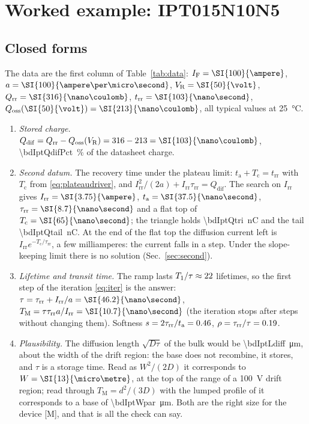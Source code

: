 \documentclass[10pt,a4paper]{scrartcl}
\newcommand{\IF}{I_\mathrm{F}}
\newcommand{\VR}{V_\mathrm{R}}
\newcommand{\Irr}{I_\mathrm{rr}}
\newcommand{\Qrr}{Q_\mathrm{rr}}
\newcommand{\Qdif}{Q_\mathrm{dif}}
\newcommand{\Qoss}{Q_\mathrm{oss}}
\newcommand{\trr}{t_\mathrm{rr}}
\newcommand{\ta}{t_\mathrm{a}}
\newcommand{\Tc}{T_\mathrm{c}}
\newcommand{\taurr}{\tau_\mathrm{rr}}
\newcommand{\TM}{T_\mathrm{M}}
\newcommand{\Tone}{T_1}
\newcommand{\IPT}{IPT015N10N5}
\begin{document}
\section{Worked example: \IPT{}}
\label{sec:example}
\subsection{Closed forms}
\label{sec:closed}
The data are the first column of Table~\ref{tab:data}: $\IF = \SI{\bdIptIf}{\ampere}$, $a = \SI{\bdIptSlope}{\ampere\per\micro\second}$, $\VR = \SI{\bdIptVr}{\volt}$, $\Qrr = \SI{\bdIptQrr}{\nano\coulomb}$, $\trr = \SI{\bdIptTrr}{\nano\second}$, $\Qoss(\SI{50}{\volt}) = \SI{\bdIptQoss}{\nano\coulomb}$, all typical values at \SI{25}{\celsius}.
\begin{enumerate}
\item \emph{Stored charge.} $\Qdif = \Qrr - \Qoss(\VR) = \bdIptQrr - \bdIptQoss = \SI{\bdIptQdif}{\nano\coulomb}$, \SI{\bdIptQdifPct}{\percent} of the datasheet charge.
\item \emph{Second datum.} The recovery time under the plateau limit: $\ta + \Tc = \trr$ with $\Tc$ from \eqref{eq:plateaudriver}, and $\Irr^2/(2a) + \Irr\taurr = \Qdif$. The search on $\Irr$ gives $\Irr = \SI{\bdIptIrr}{\ampere}$, $\ta = \SI{\bdIptTa}{\nano\second}$, $\taurr = \SI{\bdIptTaurr}{\nano\second}$ and a flat top of $\Tc = \SI{\bdIptTc}{\nano\second}$; the triangle holds \SI{\bdIptQtri}{\nano\coulomb} and the tail \SI{\bdIptQtail}{\nano\coulomb}. At the end of the flat top the diffusion current left is $\Irr e^{-\Tc/\taurr}$, a few milliamperes: the current falls in a step. Under the slope-keeping limit there is no solution (Sec.~\ref{sec:second}).
\item \emph{Lifetime and transit time.} The ramp lasts $\Tone/\tau \approx \bdIptX$ lifetimes, so the first step of the iteration \eqref{eq:iter} is the answer: $\tau = \taurr + \Irr/a = \SI{\bdIptTauOne}{\nano\second}$, $\TM = \tau\taurr a/\Irr = \SI{\bdIptTmOne}{\nano\second}$ (the iteration stops after \bdIptIter{} steps without changing them). Softness $s = 2\taurr/\ta = \bdIptS$, $\rho = \taurr/\tau = \bdIptRho$.
\item \emph{Plausibility.} The diffusion length $\sqrt{D\tau}$ of the bulk would be \SI{\bdIptLdiff}{\micro\metre}, about the width of the drift region: the base does not recombine, it stores, and $\tau$ is a storage time. Read as $W^2/(2D)$ it corresponds to $W = \SI{\bdIptWstore}{\micro\metre}$, at the top of the range of a \SI{100}{\volt} drift region; read through $\TM = d^2/(3D)$ with the lumped profile of \cite{lmnote} it corresponds to a base of \SI{\bdIptWpar}{\micro\metre}. Both are the right size for the device [M], and that is all the check can say.

\end{enumerate}
\end{document}
